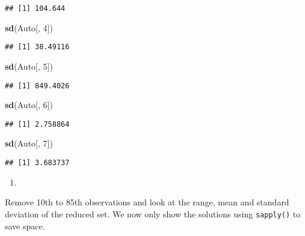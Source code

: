 \documentclass[
]{article}
\newenvironment{Shaded}{\begin{snugshade}}{\end{snugshade}}
\newcommand{\DecValTok}[1]{\textcolor[rgb]{0.00,0.00,0.81}{#1}}
\newcommand{\FunctionTok}[1]{\textcolor[rgb]{0.13,0.29,0.53}{\textbf{#1}}}
\newcommand{\NormalTok}[1]{#1}
\providecommand{\tightlist}{%
  \setlength{\itemsep}{0pt}\setlength{\parskip}{0pt}}
\begin{document}
\begin{verbatim}
## [1] 104.644
\end{verbatim}

\begin{Shaded}
\begin{Highlighting}[]
\FunctionTok{sd}\NormalTok{(Auto[, }\DecValTok{4}\NormalTok{])}
\end{Highlighting}
\end{Shaded}

\begin{verbatim}
## [1] 38.49116
\end{verbatim}

\begin{Shaded}
\begin{Highlighting}[]
\FunctionTok{sd}\NormalTok{(Auto[, }\DecValTok{5}\NormalTok{])}
\end{Highlighting}
\end{Shaded}

\begin{verbatim}
## [1] 849.4026
\end{verbatim}

\begin{Shaded}
\begin{Highlighting}[]
\FunctionTok{sd}\NormalTok{(Auto[, }\DecValTok{6}\NormalTok{])}
\end{Highlighting}
\end{Shaded}

\begin{verbatim}
## [1] 2.758864
\end{verbatim}

\begin{Shaded}
\begin{Highlighting}[]
\FunctionTok{sd}\NormalTok{(Auto[, }\DecValTok{7}\NormalTok{])}
\end{Highlighting}
\end{Shaded}

\begin{verbatim}
## [1] 3.683737
\end{verbatim}

\begin{enumerate}
\def\labelenumi{\alph{enumi})}
\setcounter{enumi}{3}
\tightlist
\item
\end{enumerate}

Remove 10th to 85th observations and look at the range, mean and
standard deviation of the reduced set. We now only show the solutions
using \texttt{sapply()} to save space.
\end{document}

